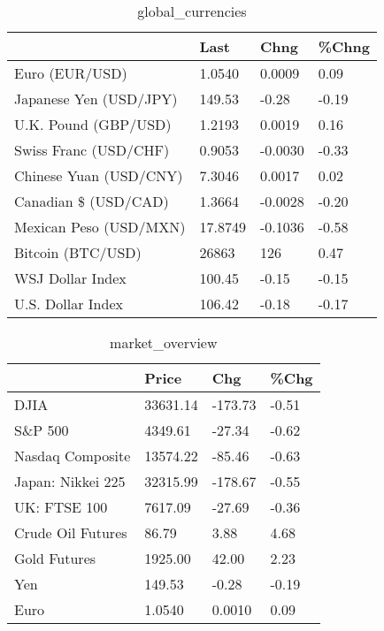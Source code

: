 \documentclass{article}%
\begin{document}
%


\begin{table}[htbp]%
\caption{global\_currencies}%
\centering%
\begin{adjustbox}{width=1\textwidth}%
\begin{tabular}{llll}
\toprule
                       &    Last &    Chng & \%Chng \\
\midrule
        Euro (EUR/USD) &  1.0540 &  0.0009 &  0.09 \\
Japanese Yen (USD/JPY) &  149.53 &   -0.28 & -0.19 \\
  U.K. Pound (GBP/USD) &  1.2193 &  0.0019 &  0.16 \\
 Swiss Franc (USD/CHF) &  0.9053 & -0.0030 & -0.33 \\
Chinese Yuan (USD/CNY) &  7.3046 &  0.0017 &  0.02 \\
  Canadian \$ (USD/CAD) &  1.3664 & -0.0028 & -0.20 \\
Mexican Peso (USD/MXN) & 17.8749 & -0.1036 & -0.58 \\
     Bitcoin (BTC/USD) &   26863 &     126 &  0.47 \\
      WSJ Dollar Index &  100.45 &   -0.15 & -0.15 \\
     U.S. Dollar Index &  106.42 &   -0.18 & -0.17 \\
\bottomrule
\end{tabular}
%
\end{adjustbox}%
\end{table}

%


\begin{table}[htbp]%
\caption{market\_overview}%
\centering%
\begin{adjustbox}{width=1\textwidth}%
\begin{tabular}{llll}
\toprule
                  &    Price &     Chg &  \%Chg \\
\midrule
             DJIA & 33631.14 & -173.73 & -0.51 \\
          S\&P 500 &  4349.61 &  -27.34 & -0.62 \\
 Nasdaq Composite & 13574.22 &  -85.46 & -0.63 \\
Japan: Nikkei 225 & 32315.99 & -178.67 & -0.55 \\
     UK: FTSE 100 &  7617.09 &  -27.69 & -0.36 \\
Crude Oil Futures &    86.79 &    3.88 &  4.68 \\
     Gold Futures &  1925.00 &   42.00 &  2.23 \\
              Yen &   149.53 &   -0.28 & -0.19 \\
             Euro &   1.0540 &  0.0010 &  0.09 \\
\bottomrule
\end{tabular}
%
\end{adjustbox}%
\end{table}

%
\end{document}
